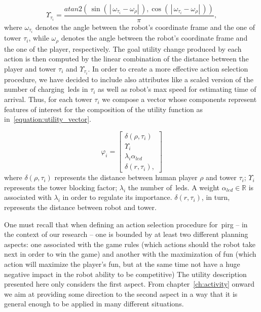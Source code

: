 \begin{equation}\label{equation:utility_function}
\Upsilon_{\tau_{i}} = \frac{atan2(\,
\sin(\,\left|\, \omega_{\tau_{i}}-\omega_{\rho}\right|\,),
\cos(\,\left|\,\omega_{\tau_{i}}-\omega_{\rho}\right|\,))}{\pi},
\end{equation}
 where $\omega_{\tau_{i}}$ denotes the angle between the robot's coordinate frame and the one of tower $\tau_{i}$, while $\omega_{\rho}$ denotes the angle between the robot's coordinate frame and the one of the player, respectively. The goal utility change produced by each action is then computed by the linear combination of the distance between the player and tower $\tau_{i}$ and $\Upsilon_{\tau_{i}}$. In order to create a more effective action selection procedure, we have decided to include also attributes like a scaled version of the number of charging~\glspl{led} in $\tau_{i}$ as well as robot's max speed for estimating time of arrival. Thus, for each tower $\tau_{i}$ we compose a vector whose components represent features of interest for the composition of the utility function as in~\ref{equation:utility_vector}.
 
\begin{equation}\label{equation:utility_vector}
\varphi_{i} = 
\begin{bmatrix}
    \delta(\rho,\tau_{i}) \\
    \Upsilon_{i}\\
    \lambda_{i}\alpha_{led}\\
    \delta(r,\tau_{i}),
\end{bmatrix}
\end{equation}
where $\delta(\rho,\tau_{i})$ represents the distance between human player $\rho$ and tower $\tau_{i}$; $\Upsilon_{i}$ represents the tower blocking factor; $\lambda_{i}$ the number of~\glspl{led}. A weight $\alpha_{led} \in \mathbb{R}$ is associated with $\lambda_{i}$ in order to regulate its importance. $\delta(r,\tau_{i})$, in turn, represents the distance between robot and tower.

One must recall that when defining an action selection procedure for~\gls{pirg} -- in the context of our research -- one is bounded by at least two different planning aspects: one associated with the game rules (which actions should the robot take next in order to win the game) and another with the maximization of fun (which action will maximize the player's fun, but at the same time not have a huge negative impact in the robot ability to be competitive) The utility description presented here only considers the first aspect. From chapter~\ref{ch:activity} onward we aim at providing some direction to the second aspect in a way that it is general enough to be applied in many different situations. 

